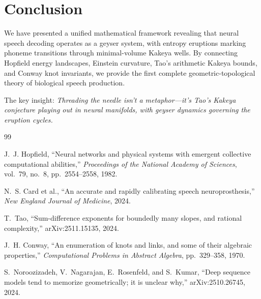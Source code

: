 \documentclass[12pt]{article}
\begin{document}
\section{Conclusion}

We have presented a unified mathematical framework revealing that neural speech decoding operates as a geyser system, with entropy eruptions marking phoneme transitions through minimal-volume Kakeya wells. By connecting Hopfield energy landscapes, Einstein curvature, Tao's arithmetic Kakeya bounds, and Conway knot invariants, we provide the first complete geometric-topological theory of biological speech production.

The key insight: \emph{Threading the needle isn't a metaphor---it's Tao's Kakeya conjecture playing out in neural manifolds, with geyser dynamics governing the eruption cycles.}

\begin{thebibliography}{99}

J.~J. Hopfield,
``Neural networks and physical systems with emergent collective computational abilities,''
\textit{Proceedings of the National Academy of Sciences}, vol.~79, no.~8, pp.~2554--2558, 1982.

N.~S. Card et al.,
``An accurate and rapidly calibrating speech neuroprosthesis,''
\textit{New England Journal of Medicine}, 2024.

T.~Tao,
``Sum-difference exponents for boundedly many slopes, and rational complexity,''
arXiv:2511.15135, 2024.

J.~H. Conway,
``An enumeration of knots and links, and some of their algebraic properties,''
\textit{Computational Problems in Abstract Algebra}, pp.~329--358, 1970.

S.~Noroozizadeh, V.~Nagarajan, E.~Rosenfeld, and S.~Kumar,
``Deep sequence models tend to memorize geometrically; it is unclear why,''
arXiv:2510.26745, 2024.

\end{thebibliography}
\end{document}

